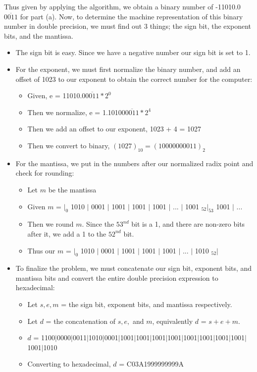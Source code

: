 \documentclass[12pt]{article}
\begin{document}
\begin{enumerate}
\begin{center}
\begin{tabular}{ c c }
	\end{tabular}
	\end{center}

Thus given by applying the algorithm, we obtain a binary number of -11010.0$\overline{0011}$ for part (a). Now, to determine the machine representation of this binary number in double precision, we must find out 3 things; the sign bit, the exponent bits, and the mantissa. 

	\begin{itemize}
		\item The sign bit is easy. Since we have a negative number our sign bit is set to 1.
		\item For the exponent, we must first normalize the binary number, and add an offset of 1023 to our exponent to obtain the correct number for the computer:
			\begin{itemize}
				\item[] Given, e = 11010.0$\overline{0011} * 2^0$
				\item[] Then we normalize, e = 1.10100$\overline{0011} * 2^4$
				\item[] Then we add an offset to our exponent, 1023 + 4 = 1027 
				\item[] Then we convert to binary, $(1027)_{10} = (10000000011)_2$
			\end{itemize}
		
		\item For the mantissa, we put in the numbers after our normalized radix point and check for rounding:
			\begin{itemize}
				\item[] Let $m$ be the mantissa
				\item[] Given $m$ = $|_{0}$ 1010 $|$ 0001 $|$ 1001 $|$ 1001 $|$ 1001 $|$ ... $|$ 1001 $_{52}|_{53}$ 1001 $|$ ...
				\item[] Then we round $m$. Since the $53^{nd}$ bit is a 1, and there are non-zero bits after it, we add a 1 to the $52^{nd}$ bit.
				\item[] Thus our $m$ = $|_{0}$ 1010 $|$ 0001 $|$ 1001 $|$ 1001 $|$ 1001 $|$ ... $|$ 1010 $_{52}|$
			\end{itemize}
			
		\item To finalize the problem, we must concatenate our sign bit, exponent bits, and mantissa bits and convert the entire double precision expression to hexadecimal: 
			\begin{itemize}
				\item[] Let $s, e, m$ = the sign bit, exponent bits, and mantissa respectively.
				\item[] Let $d$ = the concatenation of $s, e, $ and $m$, equivalently $d$ = $s + e + m$.
				\item[] $d$ = 1100$|$0000$|$0011$|$1010$|$0001$|$1001$|$1001$|$1001$|$1001$|$1001$|$1001$|$1001$|$1001$|$1001$|$1010
				\item[] Converting to hexadecimal, $d$ = C03A1999999999A
			\end{itemize}
			

\end{itemize}
\end{enumerate}
\end{document}
